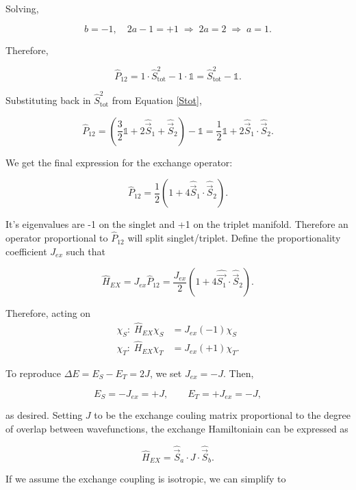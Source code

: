 \documentclass[svgnames]{article}
\begin{document}
Solving, 

\[
b = -1, \quad 2a-1=+1 \; \Rightarrow \; 2a=2 \; \Rightarrow \; a = 1. 
\] 

Therefore, 

\[
    \hat{P}_{12} = 1 \cdot \hat{S}_\text{tot}^2 - 1 \cdot \mathds{1} =
    \hat{S}_\text{tot}^2 - \mathds{1}.   
\] 


Substituting back in $\hat{S}_\text{tot}^2$ from Equation \ref{Stot}, 

\[
    \hat{P}_{12} = \left( \frac{3}{2}\mathds{1} + 2 \hat{\vec{S}}_1 +
    \hat{\vec{S}}_2 \right) - \mathds{1} = \frac{1}{2}\mathds{1} + 2
    \hat{\vec{S}}_1 \cdot \hat{\vec{S}}_2.   
\] \vspace{3px}


We get the final expression for the exchange operator: 


\[
    \hat{P}_{12} = \frac{1}{2}\left(1 + 4 \hat{\vec{S}}_1 \cdot \hat{\vec{S}}_2
    \right).
\] \vspace{3px}

It's eigenvalues are -1 on the singlet and +1 on the triplet manifold. Therefore
an operator proportional to $\hat{P}_{12}$ will split singlet/triplet. Define
the proportionality coefficient $J_{ex}$ such that 

 \[
     \hat{H}_{EX} = J_{ex} \hat{P}_{12} = \frac{J_{ex}}{2}\left(1 + 4 \hat{\vec{S_1}} \cdot
     \hat{\vec{S}}_2\right). 
\] \vspace{3px}

Therefore, acting on 
\begin{align*}
    \chi_S: \; \hat{H}_{EX} \chi_S &= J_{ex} (-1) \chi_S \\ 
    \chi_T: \; \hat{H}_{EX} \chi_T &= J_{ex} (+1) \chi_T. 
\end{align*}

To reproduce $\Delta E = E_S - E_T = 2J$, we set  $J_{ex} = -J$. Then, 

 \[
     E_S = -J_{ex} = +J, \qquad E_T = +J_{ex} = -J, 
\] \vspace{3px}

as desired. Setting $J$ to be the exchange couling matrix proportional to the
degree of overlap between wavefunctions, the exchange Hamiltoniain can be
expressed as 

 \[
     \hat{H}_{EX} = \hat{\vec{S}}_a \cdot J \cdot \hat{\vec{S}}_b. 
\] \vspace{3px}

If we assume the exchange coupling is isotropic, we can simplify to 
\end{document}
